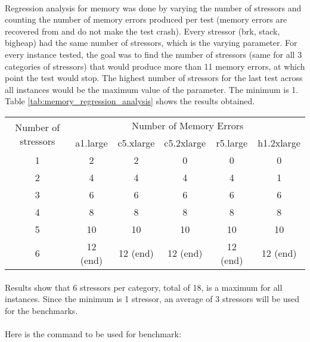 \documentclass[11pt]{article}
\begin{document}
		\paragraph{} Regression analysis for memory was done by varying the number of stressors
		and counting the number of memory errors produced per test (memory errors
		are recovered from and do not make the test crash). Every stressor (brk,
		stack, bigheap) had the same number of stressors, which is the varying
		parameter. For every instance tested, the goal was to find the number of
		stressors (same for all 3 categories of stressors) that would produce more
		than 11 memory errors, at which point the test would stop. The highest
		number of stressors for the last test across all instances would be the
		maximum value of the parameter. The minimum is 1. Table \ref{tab:memory_regression_analysis}
		shows the results obtained.
		\begin{center}
			 \label{tab:memory_regression_analysis}
			\begin{tabular}{|*{6}{c|}}
				\hline
				\multirow{2}{2cm}{Number of stressors} & \multicolumn{5}{c}{Number of Memory Errors}\vline \\\cline{2-6}
				& a1.large & c5.xlarge & c5.2xlarge & r5.large & h1.2xlarge \\
				\hline
				1 & 2 & 2 & 0 & 0 & 0 \\
				2 & 4 & 4 & 4 & 4 & 1 \\
				3 & 6 & 6 & 6 & 6 & 6 \\
				4 & 8 & 8 & 8 & 8 & 8 \\
				5 & 10 & 10 & 10 & 10 & 10\\
				6 & 12 (end) & 12 (end) & 12 (end) & 12 (end)& 12 (end)\\
				\hline
			\end{tabular}
		\end{center}
		\paragraph{} Results show that 6 stressors per category, total of 18,
		is a maximum for all instances. Since the minimum is 1
		stressor, an average of 3 stressors will be used for the benchmarks.

		\paragraph{} Here is the command to be used for benchmark:\bigskip
\end{document}

